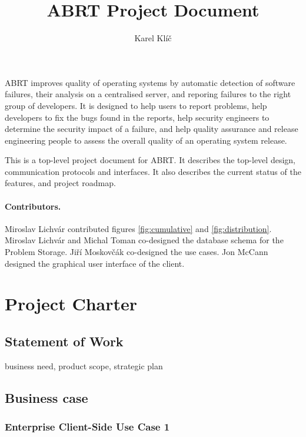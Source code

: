 \documentclass{article}
\title{ABRT Project Document}
\author{Karel Klíč}
\begin{document}
\maketitle

ABRT improves quality of operating systems by automatic detection of
software failures, their analysis on a centralised server, and
reporing failures to the right group of developers.  It is designed to
help users to report problems, help developers to fix the bugs found
in the reports, help security engineers to determine the security
impact of a failure, and help quality assurance and release
engineering people to assess the overall quality of an operating
system release.

This is a top-level project document for ABRT.  It describes the
top-level design, communication protocols and interfaces.  It also
describes the current status of the features, and project roadmap.

\paragraph{Contributors.}  Miroslav Lichvár contributed figures
\ref{fig:cumulative} and \ref{fig:distribution}.  Miroslav Lichvár and
Michal Toman co-designed the database schema for the Problem Storage.
Jiří Moskovčák co-designed the use cases.  Jon McCann designed the
graphical user interface of the client.

\cleardoublepage
\tableofcontents

\cleardoublepage
\section{Project Charter}

\subsection{Statement of Work}

business need, product scope, strategic plan

\subsection{Business case}

\subsubsection{Enterprise Client-Side Use Case 1}
\end{document}
